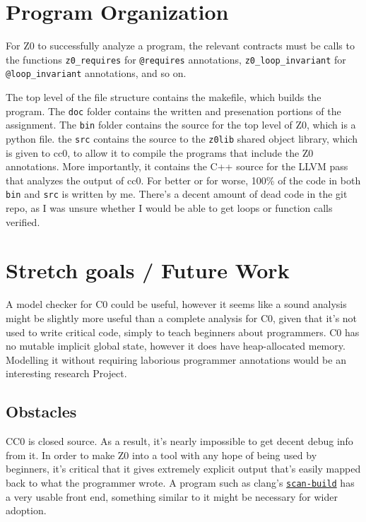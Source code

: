 \documentclass[12pt]{article}
\begin{document}
\section{Program Organization}
For Z0 to successfully analyze a program, the relevant contracts must be calls to the functions
\verb|z0_requires| for \verb|@requires| annotations, \verb|z0_loop_invariant| for \verb|@loop_invariant| annotations, and so on.

The top level of the file structure contains the makefile, which builds the program.
The \texttt{doc} folder contains the written and presenation portions of the assignment.
The \texttt{bin} folder contains the source for the top level of Z0, which is a python file.
the \texttt{src} contains the source to the \texttt{z0lib} shared object library, which is given to cc0, to allow it to compile the programs that include the Z0 annotations. More importantly, it contains the C++ source for the LLVM pass that analyzes the output of cc0. For better or for worse, 100\% of the code in both \texttt{bin} and \texttt{src} is written by me. There's a decent amount of dead code in the git repo, as I was unsure whether I would be able to get loops or function calls verified.

\section{Stretch goals / Future Work}
A model checker for C0 could be useful, however it seems like a sound analysis might be slightly more useful than a complete analysis for C0, given that it's not used to write critical code, simply to teach beginners about programmers.
C0 has no mutable implicit global state, however it does have heap-allocated memory. Modelling it without requiring laborious programmer annotations would be an interesting research Project.

\subsection{Obstacles}
CC0 is closed source. As a result, it's nearly impossible to get decent debug info from it. In order to make Z0 into a tool with any hope of being used by beginners, it's critical that it gives extremely explicit output that's easily mapped back to what the programmer wrote. A program such as clang's \href{https://clang-analyzer.llvm.org}{\texttt{scan-build}} has a very usable front end, something similar to it might be necessary for wider adoption.

\printbibliography
\end{document}
